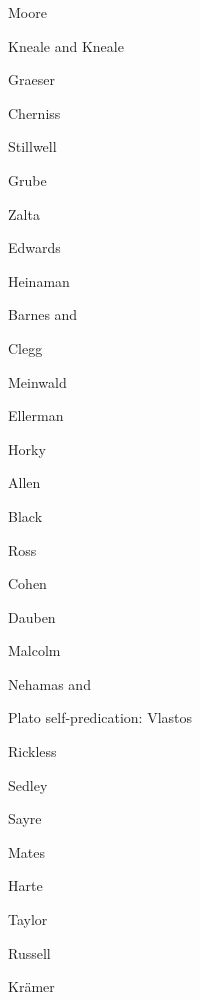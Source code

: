 \documentclass{article}
\theoremstyle{definition}
\begin{document}
Moore \cite{moore}

Kneale and Kneale \cite{kneale}

Graeser \cite{graeser}

Cherniss \cite{cherniss}

Stillwell \cite{stillwell}

Grube \cite{grube}

Zalta \cite{zalta}

Edwards \cite{edwards}

Heinaman \cite{heinaman}

Barnes \cite{barnes} and \cite{barnes2009}

Clegg \cite{clegg}

Meinwald \cite{meinwald}

Ellerman \cite{ellerman}

Horky \cite{horky}

Allen \cite{allen1960}

Black \cite{black}

Ross \cite{ross}

Cohen \cite{cohen}

Dauben \cite{dauben}

Malcolm \cite{malcolm}

Nehamas \cite{nehamas} and \cite{nehamas1982}

Plato self-predication: Vlastos \cite{vlastos1981}

Rickless \cite{rickless}

Sedley \cite{sedley}

Sayre \cite{sayre}

Mates \cite{mates}

Harte \cite{harte}

Taylor \cite{taylor}

Russell \cite{russell}

Kr\"amer \cite{kramer}




\end{document}
